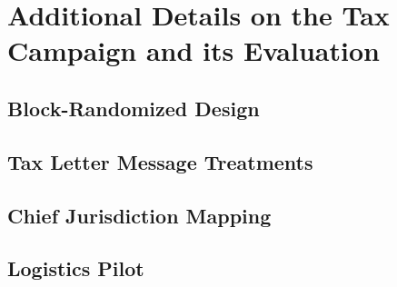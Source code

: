 \documentclass[12pt,english]{article}
\begin{document}

\clearpage


\section{Additional Details on the Tax Campaign and its Evaluation}
\label{additional_campaign_details}


\FloatBarrier


\subsection{Block-Randomized Design}
\label{randomization}


\FloatBarrier


\subsection{Tax Letter Message Treatments}
\label{information_treatments}


\FloatBarrier


\subsection{Chief Jurisdiction Mapping}

\label{chief_selection}


\FloatBarrier


\subsection{Logistics Pilot}
\label{logistics_pilot}
\end{document}
